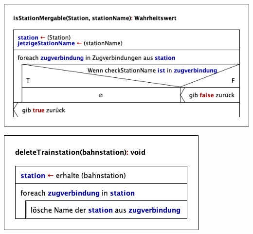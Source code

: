 \begin{center}
    \includegraphics[width=\linewidth]{images/Struktogramme/reducer/reduction2/isStationMergable.png}
    \label{pro:subsubsecpar:ueberpruefung-ob-stationen-zusammenfassbar-sind}
\end{center}

\begin{center}
    \includegraphics[width=\linewidth]{images/Struktogramme/reducer/reduction2/deleteTrainstation.png}
    \label{pro:subsubsecpar:entfernen-von-stationen}
\end{center}


